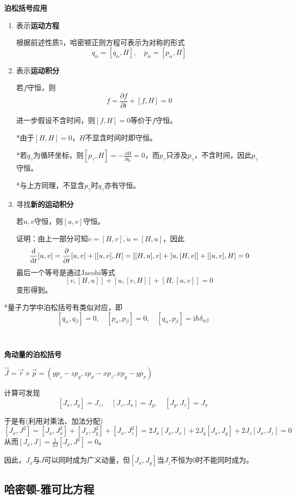 \documentclass[a4paper,UTF8,fontset=windows]{ctexart}
\newcommand*{\dr}{\hspace{0.07em}\mathrm{d}}
\begin{document}
\textbf{泊松括号应用}
\begin{enumerate}
    \item 表示\textbf{运动方程}
    
    根据前述性质5，哈密顿正则方程可表示为对称的形式
    $$\dot{q}_\alpha=[q_\alpha,H],\quad\dot{p}_\alpha=[p_\alpha,H]$$

    \item 表示\textbf{运动积分}
    
    若$f$守恒，则
    $$\dot{f}=\frac{\partial f}{\partial t}+[f,H]=0$$
    
    进一步假设不含时间，则$[f,H]=0$等价于$f$守恒。

    *由于$[H,H]=0$，$H$不显含时间时即守恒。

    *若$q_\gamma$为循环坐标，则$[p_\gamma,H]=-\frac{\partial H}{\partial q_\gamma}=0$，而$p_\gamma$只涉及$p_\gamma$，不含时间，因此$p_\gamma$守恒。
    
    *与上方同理，不显含$p_\gamma$时$q_\gamma$亦有守恒。

    \item 寻找\textbf{新的运动积分}
    
    若$u,v$守恒，则$[u,v]$守恒。

    证明：由上一部分可知$\dot{v}=[H,v],\dot{u}=[H,u]$，因此
    $$\frac{\dr}{\dr t}[u,v]=\frac{\partial}{\partial t}[u,v]+[[u,v],H]=[[H,u],v]+[u,[H,v]]+[[u,v],H]=0$$
    最后一个等号是通过Jacobi等式
    $$[v,[H,u]]+[u,[v,H]]+[H,[u,v]]=0$$
    变形得到。
\end{enumerate}

*量子力学中泊松括号有类似对应，即
$$[q_\alpha,q_\beta]=0,\quad[p_\alpha,p_\beta]=0,\quad[q_\alpha,p_\beta]=\mathrm{i}\hbar\delta_{\alpha\beta}$$

\

\textbf{角动量的泊松括号}

$\vec{J}=\vec{r}\times\vec{p}=(yp_z-zp_y,zp_x-xp_z,xp_y-yp_x)$

计算可发现
$$[J_x,J_y]=J_z,\quad[J_z,J_x]=J_y,\quad[J_y,J_z]=J_x$$

于是有(利用对乘法、加法分配)
$$[J_x,J^2]=[J_x,J_x^2]+[J_x,J_y^2]+[J_x,J_z^2]=2J_x[J_x,J_x]+2J_y[J_x,J_y]+2J_z[J_x,J_z]=0$$
从而$[J_x,J]=\frac{1}{2J}[J_x,J^2]=0$。

因此，$J_x$与$J$可以同时成为广义动量，但$[J_x,J_y]$当$J_z$不恒为0时不能同时成为。

\subsection{哈密顿-雅可比方程}
\end{document}
